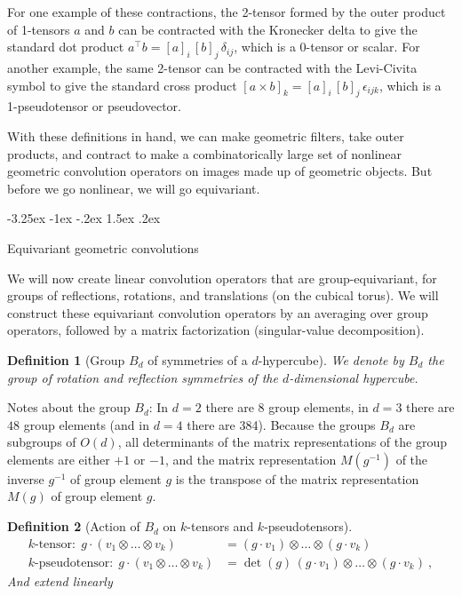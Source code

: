 \documentclass{article}
\makeatletter
\theoremstyle{plain}
\newtheorem{definition}{Definition}
\renewcommand\section{\@startsection {section}{1}{\z@}%
  {-3.25ex \@plus -1ex \@minus -.2ex}%
  {1.5ex \@plus .2ex}%
  {\raggedright\normalfont\large\bfseries}}
\makeatother
\begin{document}
For one example of these contractions, the 2-tensor formed by the outer product of 1-tensors $a$ and $b$ can be contracted with the Kronecker delta to give the standard dot product $a^\top b = [a]_i\,[b]_j\,\delta_{ij}$, which is a 0-tensor or scalar.
For another example, the same 2-tensor can be contracted with the Levi-Civita symbol to give the standard cross product
$[a\times b]_k = [a]_i\,[b]_j\,\epsilon_{ijk}$, which is a 1-pseudotensor or pseudovector.

With these definitions in hand, we can make geometric filters, take outer products, and contract to make a combinatorically large set of nonlinear geometric convolution operators on images made up of geometric objects.
But before we go nonlinear, we will go equivariant.

\section{Equivariant geometric convolutions}\label{sec:equivariant}

We will now create linear convolution operators that are group-equivariant, for groups of reflections, rotations, and translations (on the cubical torus).
We will construct these equivariant convolution operators by an averaging over group operators, followed by a matrix factorization (singular-value decomposition).

\begin{definition}[Group $B_d$ of symmetries of a $d$-hypercube]
We denote by $B_d$ the group of rotation and reflection symmetries of the $d$-dimensional hypercube.
\end{definition}

Notes about the group $B_d$: In $d=2$ there are $8$ group elements, in $d=3$ there are $48$ group elements (and in $d=4$ there are 384). Because the groups $B_d$ are subgroups of $O(d)$, all determinants of the matrix representations of the group elements are either $+1$ or $-1$, and the matrix representation $M(g^{-1})$ of the inverse $g^{-1}$ of group element $g$ is the transpose of the matrix representation $M(g)$ of group element $g$.

\begin{definition}[Action of $B_d$ on $k$-tensors and $k$-pseudotensors]
\begin{align}
\mbox{$k$-tensor:} ~~ g\cdot(v_1 \otimes \ldots \otimes v_k) &= (g\cdot v_1)\otimes\ldots\otimes(g\cdot v_k) \\
\mbox{$k$-pseudotensor:} ~~ g\cdot(v_1 \otimes \ldots \otimes v_k) &= \det(g)\,(g\cdot v_1)\otimes\ldots\otimes(g\cdot v_k) ~,
\end{align}
And extend linearly
\end{definition}
\end{document}
